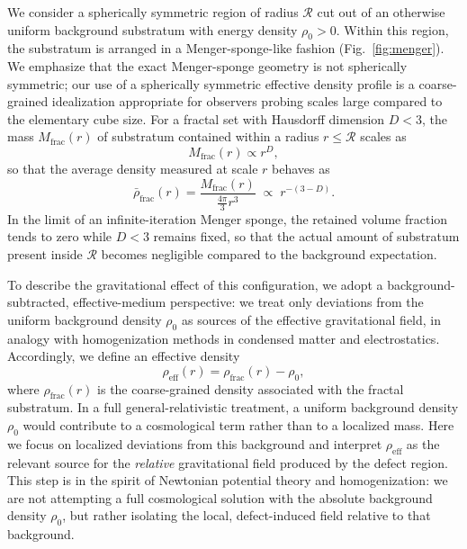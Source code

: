 \documentclass[%
  reprint,
  superscriptaddress,
  showpacs,
  showkeys,
  amsmath,amssymb,
  pra,
  longbibliography,
  floatfix,
  x11names
]{revtex4-2}
\begin{document}
We consider a spherically symmetric region of radius $\mathcal{R}$ cut out of an otherwise uniform background substratum with energy density $\rho_0>0$.
Within this region, the substratum is arranged in a Menger-sponge-like fashion (Fig.~\ref{fig:menger}).
We emphasize that the exact Menger-sponge geometry is not spherically symmetric; our use of a spherically symmetric effective density profile is a coarse-grained idealization
appropriate for observers probing scales large compared to the elementary cube size. For a fractal set with Hausdorff dimension $D<3$, the mass $M_{\text{frac}}(r)$
of substratum contained within a radius $r\le \mathcal{R}$ scales as
\begin{equation}
M_{\text{frac}}(r) \propto r^D,
\end{equation}
so that the average density measured at scale $r$ behaves as
\begin{equation}
\bar{\rho}_{\text{frac}}(r) = \frac{M_{\text{frac}}(r)}{\frac{4\pi}{3} r^3}
\;\propto\;
r^{-(3-D)}.
\label{eq:scaling}
\end{equation}
In the limit of an infinite-iteration Menger sponge, the retained volume fraction tends to zero while $D<3$ remains fixed, so that the actual amount of substratum present inside $\mathcal{R}$ becomes negligible compared to the background expectation.

To describe the gravitational effect of this configuration, we adopt a background-subtracted, effective-medium perspective: we treat only deviations from the uniform background density $\rho_0$ as sources of the effective gravitational field, in analogy with homogenization methods in condensed matter and electrostatics. Accordingly, we define an effective density
\begin{equation}
\rho_{\text{eff}}(r) = \rho_{\text{frac}}(r) - \rho_0,
\label{eq:rho_eff_def}
\end{equation}
where $\rho_{\text{frac}}(r)$ is the coarse-grained density associated with the fractal substratum. In a full general-relativistic treatment, a uniform background density $\rho_0$ would contribute to a cosmological term rather than to a localized mass.
Here we focus on localized deviations from this background and interpret $\rho_{\text{eff}}$ as the relevant source for the \emph{relative} gravitational field produced by the defect region.
This step is in the spirit of Newtonian potential theory and homogenization: we are not attempting a full cosmological solution with the absolute background density $\rho_0$, but rather isolating the local, defect-induced field relative to that background.
\end{document}
